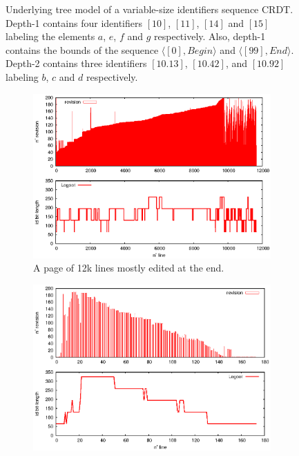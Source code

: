 \begin{figure}[h]
\begin{center}

\caption{Underlying tree model of a variable-size identifiers sequence CRDT.
  Depth-1 contains four identifiers $[10]$, $[11]$, $[14]$ and $[15]$ labeling
  the elements $a$, $e$, $f$ and $g$ respectively. Also, depth-1 contains the
  bounds of the sequence $\langle [0], Begin \rangle$ and $\langle [99],End
  \rangle$. Depth-2 contains three identifiers $[10.13]$, $[10.42]$, and
  $[10.92]$ labeling $b$, $c$ and $d$ respectively.  }
\label{fig:treeexample}
\end{center}
\end{figure}


\begin{figure}
\begin{subfigure}[t]{0.47\textwidth}
  \includegraphics[width=\textwidth]{img/compliant.eps}
  \caption{A page of 12k lines mostly edited at
    the end.}
  \label{im:posteonlyblue}
\end{subfigure}
\hfill
\begin{subfigure}[t]{0.47\textwidth}
\includegraphics[width=\textwidth]{img/motivating.eps}

\end{subfigure}
\end{figure}
